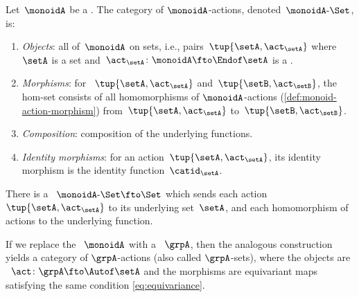 \begin{ctdefinition}
    \label{def:cat-monoid-actions}
    Let~$\monoidA$ be a .
    The category of $\monoidA$-actions, denoted~$\monoidA\text{-}\Set$, is:
    \begin{enumerate}
        \item \emph{Objects}: all  of~$\monoidA$ on sets, i.e., pairs~$\tup{\setA, \act_\setA}$ where~$\setA$ is a set and~$\act_\setA \colon \monoidA \fto \Endof\setA$ is a .
        \item \emph{Morphisms}: for ~$\tup{\setA, \act_\setA}$ and~$\tup{\setB, \act_\setB}$, the hom-set consists of all homomorphisms of $\monoidA$-actions (\cref{def:monoid-action-morphism}) from~$\tup{\setA, \act_\setA}$ to~$\tup{\setB, \act_\setB}$.
        \item \emph{Composition}: composition of the underlying functions.
        \item \emph{Identity morphisms}: for an action~$\tup{\setA, \act_\setA}$, its identity morphism is the identity function~$\catid_\setA$.
    \end{enumerate}
\end{ctdefinition}

\begin{remark}
    There is a ~$\monoidA\text{-}\Set \fto \Set$ which sends each action~$\tup{\setA, \act_\setA}$ to its underlying set~$\setA$, and each homomorphism of actions to the underlying function.
\end{remark}

\begin{remark}
    If we replace the ~$\monoidA$ with a ~$\grpA$, then the analogous construction yields a category of $\grpA$-actions (also called $\grpA$-sets), where the objects are ~$\act \colon \grpA \fto \Autof\setA$ and the morphisms are equivariant maps satisfying the same condition \cref{eq:equivariance}.
\end{remark}
